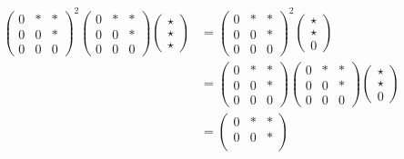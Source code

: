 \begin{example}
\begin{enumerate}
\begin{align*}
            \begin{pmatrix}
                0 & \ast &\ast\\
                0 & 0 & \ast\\
                0 & 0 & 0
            \end{pmatrix}^2 \begin{pmatrix}
                0 & \ast &\ast\\
                0 & 0 & \ast\\
                0 & 0 & 0
            \end{pmatrix}\begin{pmatrix}
                \star\\
                \star\\
                \star
            \end{pmatrix} &= \begin{pmatrix}
                0 & \ast &\ast\\
                0 & 0 & \ast\\
                0 & 0 & 0
            \end{pmatrix}^2 \begin{pmatrix}
                \star \\
                \star\\
                0
            \end{pmatrix}\\
            &= \begin{pmatrix}
                0 & \ast &\ast\\
                0 & 0 & \ast\\
                0 & 0 & 0
            \end{pmatrix}\begin{pmatrix}
                0 & \ast &\ast\\
                0 & 0 & \ast\\
                0 & 0 & 0
            \end{pmatrix}\begin{pmatrix}
                \star \\
                \star\\
                0
            \end{pmatrix}\\
            &= \begin{pmatrix}
                0 & \ast &\ast\\
                0 & 0 & \ast\\

\end{pmatrix}
\end{align*}
\end{enumerate}
\end{example}
